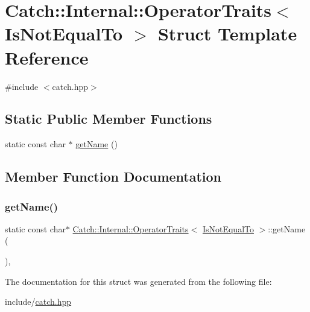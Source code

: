\hypertarget{struct_catch_1_1_internal_1_1_operator_traits_3_01_is_not_equal_to_01_4}{}\section{Catch\+:\+:Internal\+:\+:Operator\+Traits$<$ Is\+Not\+Equal\+To $>$ Struct Template Reference}
\label{struct_catch_1_1_internal_1_1_operator_traits_3_01_is_not_equal_to_01_4}


{\ttfamily \#include $<$catch.\+hpp$>$}

\subsection*{Static Public Member Functions}
\begin{DoxyCompactItemize}
\item 
static const char $\ast$ \mbox{\hyperlink{struct_catch_1_1_internal_1_1_operator_traits_3_01_is_not_equal_to_01_4_a54a795b8bf7c80a9fdbc7b81f39133b4}{get\+Name}} ()
\end{DoxyCompactItemize}


\subsection{Member Function Documentation}
\mbox{\label{struct_catch_1_1_internal_1_1_operator_traits_3_01_is_not_equal_to_01_4_a54a795b8bf7c80a9fdbc7b81f39133b4}} 
\subsubsection{\texorpdfstring{get\+Name()}{getName()}}
{\footnotesize\ttfamily static const char$\ast$ \mbox{\hyperlink{struct_catch_1_1_internal_1_1_operator_traits}{Catch\+::\+Internal\+::\+Operator\+Traits}}$<$ \mbox{\hyperlink{namespace_catch_1_1_internal_ae3f96598a7858155750bf38e7295d83ea1e1699cf7d3dbee0908f1a123da2456d}{Is\+Not\+Equal\+To}} $>$\+::get\+Name (\begin{DoxyParamCaption}{ }\end{DoxyParamCaption})\hspace{0.3cm}{\ttfamily [inline]}, {\ttfamily [static]}}



The documentation for this struct was generated from the following file\+:\begin{DoxyCompactItemize}
\item 
include/\mbox{\hyperlink{catch_8hpp}{catch.\+hpp}}\end{DoxyCompactItemize}
